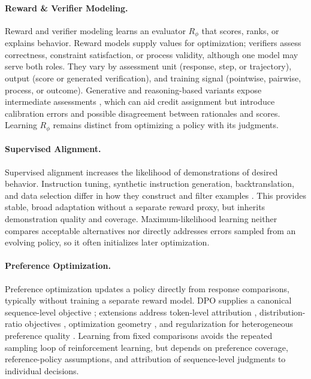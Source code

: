 \documentclass[11pt]{article}
\begin{document}
\paragraph{Reward \& Verifier Modeling.}
Reward and verifier modeling learns an evaluator \(R_{\phi}\) that scores, ranks, or explains behavior. Reward models supply values for optimization; verifiers assess correctness, constraint satisfaction, or process validity, although one model may serve both roles. They vary by assessment unit (response, step, or trajectory), output (score or generated verification), and training signal (pointwise, pairwise, process, or outcome). Generative and reasoning-based variants expose intermediate assessments \citep{zhang2025genrm,wang2025gram,chen2026rmr1}, which can aid credit assignment but introduce calibration errors and possible disagreement between rationales and scores. Learning \(R_{\phi}\) remains distinct from optimizing a policy with its judgments.

\paragraph{Supervised Alignment.}
Supervised alignment increases the likelihood of demonstrations of desired behavior. Instruction tuning, synthetic instruction generation, backtranslation, and data selection differ in how they construct and filter examples \citep{chung2024flan,li2024backtranslation,liu2024deita,xia2024less}. This provides stable, broad adaptation without a separate reward proxy, but inherits demonstration quality and coverage. Maximum-likelihood learning neither compares acceptable alternatives nor directly addresses errors sampled from an evolving policy, so it often initializes later optimization.

\paragraph{Preference Optimization.}
Preference optimization updates a policy directly from response comparisons, typically without training a separate reward model. DPO supplies a canonical sequence-level objective \citep{rafailov2023direct}; extensions address token-level attribution \citep{zeng2024token,liu2025tisdpo,oi2026autoregressive,yang2026token,zhang2025risk}, distribution-ratio objectives \citep{kim2025preference,nguyen2026tokenratio}, optimization geometry \citep{luo2026sharpness,guo2025proximalized}, and regularization for heterogeneous preference quality \citep{lee2025kl,wu2024beta}. Learning from fixed comparisons avoids the repeated sampling loop of reinforcement learning, but depends on preference coverage, reference-policy assumptions, and attribution of sequence-level judgments to individual decisions.
\end{document}
